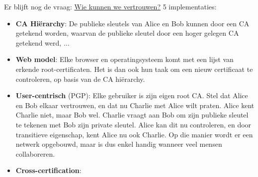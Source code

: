 \documentclass{report}
\begin{document}
	Er blijft nog de vraag: \underline{Wie kunnen we vertrouwen?} 5 implementaties:
	\begin{itemize}
		\item[\info] \textbf{CA Hiërarchy}: De publieke sleutels van Alice en Bob kunnen door een CA getekend worden, waarvan de publieke sleutel door een hoger gelegen CA getekend werd, ...
		\item[\info] \textbf{Web model}: Elke browser en operatingsysteem komt met een lijst van erkende root-certificaten. Het is dan ook hun taak om een nieuw certificaat te controleren, op basis van de CA hiërarchy.
		\item[\info] \textbf{User-centrisch} (PGP): Elke gebruiker is zijn eigen root CA. Stel dat Alice en Bob elkaar vertrouwen, en dat nu Charlie met Alice wilt praten. Alice kent Charlie niet, maar Bob wel. Charlie vraagt aan Bob om zijn publieke sleutel te tekenen met Bob zijn private sleutel. Alice kan dit nu controleren, en door transitieve eigenschap, kent Alice nu ook Charlie. Op die manier wordt er een netwerk opgebouwd, maar is dus enkel handig wanneer veel mensen collaboreren.	
		\item[\info] \textbf{Cross-certification}: 
	\end{itemize}
\end{document}
